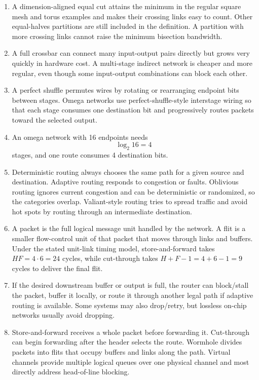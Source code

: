 \documentclass[11pt]{article}
\begin{document}
\begin{enumerate}
    \item A dimension-aligned equal cut attains the minimum in the regular square mesh and torus examples and makes their crossing links easy to count.
    Other equal-halves partitions are still included in the definition.
    A partition with more crossing links cannot raise the minimum bisection bandwidth.

    \item A full crossbar can connect many input-output pairs directly but grows very quickly in hardware cost.
    A multi-stage indirect network is cheaper and more regular, even though some input-output combinations can block each other.

    \item A perfect shuffle permutes wires by rotating or rearranging endpoint bits between stages.
    Omega networks use perfect-shuffle-style interstage wiring so that each stage consumes one destination bit and progressively routes packets toward the selected output.

    \item An omega network with 16 endpoints needs
    \[
        \log_2 16=4
    \]
    stages, and one route consumes 4 destination bits.

    \item Deterministic routing always chooses the same path for a given source and destination.
    Adaptive routing responds to congestion or faults.
    Oblivious routing ignores current congestion and can be deterministic or randomized, so the categories overlap.
    Valiant-style routing tries to spread traffic and avoid hot spots by routing through an intermediate destination.

    \item A packet is the full logical message unit handled by the network.
    A flit is a smaller flow-control unit of that packet that moves through links and buffers.
    Under the stated unit-link timing model, store-and-forward takes $HF=4\cdot6=24$ cycles, while cut-through takes $H+F-1=4+6-1=9$ cycles to deliver the final flit.

    \item If the desired downstream buffer or output is full, the router can block/stall the packet, buffer it locally, or route it through another legal path if adaptive routing is available.
    Some systems may also drop/retry, but lossless on-chip networks usually avoid dropping.

    \item Store-and-forward receives a whole packet before forwarding it.
    Cut-through can begin forwarding after the header selects the route.
    Wormhole divides packets into flits that occupy buffers and links along the path.
    Virtual channels provide multiple logical queues over one physical channel and most directly address head-of-line blocking.


\end{enumerate}
\end{document}
